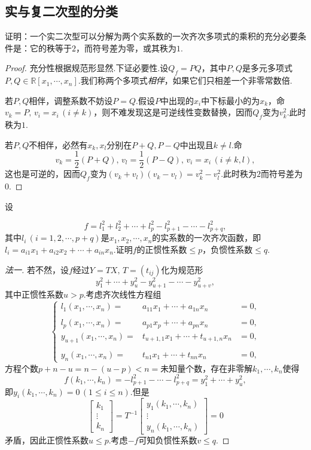 \subsection{实与复二次型的分类}
\begin{prob}[3]
	证明：一个实二次型可以分解为两个实系数的一次齐次多项式的乘积的充分必要条件是：它的秩等于$2$，而符号差为零，或其秩为$1$.
\end{prob}
\begin{proof}
	充分性根据规范形显然.下证必要性.设$Q_f=PQ$，其中$P,Q$是多元多项式$P,Q\in\mathbb{R}[x_1,\cdots,x_n]$.我们称两个多项式\emph{相伴}，如果它们只相差一个非零常数倍.

	若$P,Q$相伴，调整系数不妨设$P=Q$.假设$P$中出现的$x_i$中下标最小的为$x_k$，命$v_k=P,\,v_i=x_i\,(i\ne k)$，则不难发现这是可逆线性变数替换，因而$Q_f$变为$v_k^2$.此时秩为$1$.

	若$P,Q$不相伴，必然有$x_k,x_l$分别在$P+Q,P-Q$中出现且$k\ne l$.命
	\[
		v_k=\frac{1}{2}(P+Q),\,v_l=\frac{1}{2}(P-Q),\,v_i=x_i\,(i\ne k,l),
	\]
	这也是可逆的，因而$Q_f$变为$(v_k+v_l)(v_k-v_l)=v_k^2-v_l^2$.此时秩为$2$而符号差为$0$.
\end{proof}
\begin{prob}[5]
	\hypertarget{QuadraticFormOfDegreeOneLinearForm}{设}
	\[
		f=l_1^2+l_2^2+\cdots+l_p^2-l_{p+1}^2-\cdots-l_{p+q}^2,
	\]
	其中$l_i\,(i=1,2,\cdots,p+q)$是$x_1,x_2,\cdots,x_n$的实系数的一次齐次函数，即$l_i=a_{i1}x_1+a_{i2}x_2+\cdots+a_{in}x_n$.证明$f$的正惯性系数$\le p$，负惯性系数$\le q$.
\end{prob}
\begin{proof}[法一]
	若不然，设$f$经过$Y=TX,\,T=(t_{ij})$化为规范形
	\[
		y_1^2+\cdots+y_u^2-y_{u+1}^2-\cdots-y_{u+v}^2,
	\]
	其中正惯性系数$u>p$.考虑齐次线性方程组
	\[
		\left\{\!\!\begin{array}{rll}
			l_1(x_1,\cdots,x_n)=     & a_{11}x_1+\cdots+a_{1n}x_n       & =0, \\
			                         &                                  &     \\
			l_p(x_1,\cdots,x_n)=     & a_{p1}x_p+\cdots+a_{pn}x_n       & =0, \\
			y_{u+1}(x_1,\cdots,x_n)= & t_{u+1,1}x_1+\cdots+t_{u+1,n}x_n & =0, \\
			                         &                                  &     \\
			y_{n}(x_1,\cdots,x_n)=   & t_{n1}x_1+\cdots+t_{nn}x_n       & =0,
		\end{array}\right.
	\]
	方程个数$p+n-u=n-(u-p)<n=$未知量个数，存在非零解$k_1,\cdots,k_n$使得
	\[
		f(k_1,\cdots,k_n)=-l_{p+1}^2-\cdots-l_{p+q}^2=y_1^2+\cdots+y_u^2,
	\]
	即$y_i(k_1,\cdots,k_n)=0\,(1\le i\le n)$.但是
	\[
		\begin{bmatrix}
			k_1    \\
			\vdots \\
			k_n
		\end{bmatrix}=T^{-1}\begin{bmatrix}
			y_1(k_1,\cdots,k_n) \\
			\vdots              \\
			y_n(k_1,\cdots,k_n)
		\end{bmatrix}=0
	\]
	矛盾，因此正惯性系数$u\le p$.考虑$-f$可知负惯性系数$v\le q$.
\end{proof}
